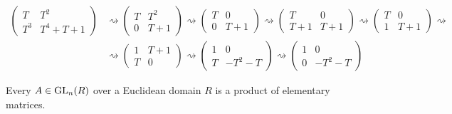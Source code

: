 \begin{example}
   \begin{equation*}
      \begin{split}
         \begin{pmatrix}T & T^2\\ T^3 & T^4+T+1\end{pmatrix} & \rightsquigarrow
         \begin{pmatrix}T & T^2\\ 0 & T+1\end{pmatrix} \rightsquigarrow
         \begin{pmatrix}T & 0 \\ 0 & T+1\end{pmatrix} \rightsquigarrow
         \begin{pmatrix}T & 0 \\ T+1 & T+1\end{pmatrix} \rightsquigarrow
         \begin{pmatrix}T & 0 \\ 1 & T+1\end{pmatrix} \rightsquigarrow \\
         & \rightsquigarrow \begin{pmatrix}1 & T+1 \\ T & 0\end{pmatrix} \rightsquigarrow
         \begin{pmatrix}1 & 0 \\ T & -T^2-T\end{pmatrix} \rightsquigarrow
         \begin{pmatrix}1 & 0 \\ 0 & -T^2-T\end{pmatrix}
      \end{split}
   \end{equation*}
\end{example}

\begin{corollary}
   Every \(A \in \operatorname{GL}_n(R)\) over a Euclidean domain \(R\) is a product of elementary matrices.
\end{corollary}

